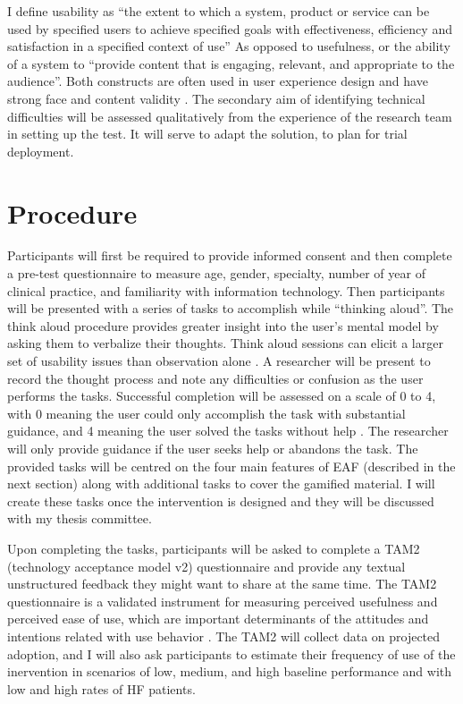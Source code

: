 I define usability as ``the extent to which a system, product or service can be used by specified users to achieve specified goals with effectiveness, efficiency and satisfaction in a specified context of use'' \cite{international1998iso} As opposed to usefulness, or the ability of a system to ``provide content that is engaging, relevant, and appropriate to the audience''. Both constructs are often used in user experience design and have strong face and content validity \cite{united2006research}. The secondary aim of identifying technical difficulties will be assessed qualitatively from the experience of the research team in setting up the test. It will serve to adapt the solution, to plan for trial deployment.

\section{Procedure}
Participants will first be required to provide informed consent and then complete a pre-test questionnaire to measure age, gender, specialty, number of year of clinical practice, and familiarity with information technology. Then participants will be presented with a series of tasks to accomplish while ``thinking aloud''. The think aloud procedure provides greater insight into the user's mental model by asking them to verbalize their thoughts. Think aloud sessions can elicit a larger set of usability issues than observation alone \cite{ericsson1980verbal}. A researcher will be present to record the thought process and note any difficulties or confusion as the user performs the tasks. Successful completion will be assessed on a scale of 0 to 4, with 0 meaning the user could only accomplish the task with substantial guidance, and 4 meaning the user solved the tasks without help \cite{rubin2008handbook}. The researcher will only provide guidance if the user seeks help or abandons the task. The provided tasks will be centred on the four main features of \gls{EAF} (described in the next section) along with additional tasks to cover the gamified material. I will create these tasks once the intervention is designed and they will be discussed with my thesis committee.

Upon completing the tasks, participants will be asked to complete a TAM2 (technology acceptance model v2) questionnaire and provide any textual unstructured feedback they might want to share at the same time. The TAM2 questionnaire is a validated instrument for measuring perceived usefulness and perceived ease of use, which are important determinants of the attitudes and intentions related with use behavior \cite{venkatesh2000theoretical}. The TAM2 will collect data on projected adoption, and I will also ask participants to estimate their frequency of use of the inervention in scenarios of low, medium, and high baseline performance and with low and high rates of HF patients.


